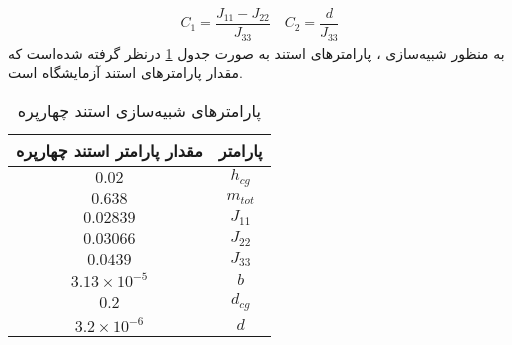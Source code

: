 \begin{align*}
	C_1 =\dfrac{J_{11}-J_{22}}{J_{33}}\quad
	C_2 =\dfrac{d}{J_{33}}
\end{align*}
به منظور شبیه‌سازی ، پارامترهای استند به صورت جدول 
\ref{parameterstable}
درنظر گرفته شده‌است که 
مقدار پارامترهای استند آزمایشگاه است.
\begin{table}[H]
	\caption {پارامترهای شبیه‌سازی استند چهارپره\cite{norian}} 
	\label{parameterstable}
	\begin{center}
		\begin{tabular}{ |c|c| }
			\hline
	مقدار پارامتر استند چهارپره& پارامتر  \\
			\hline
			 $0.02$ & $h_{cg}$ \\
			\hline
			 $0.638$ & $m_{tot}$\\
			\hline
			 $0.02839$ & $J_{11}$\\
			\hline
			 $0.03066$ & $J_{22}$\\
			\hline
			 $0.0439$ & $J_{33}$\\
			\hline
			 $3.13\times10^{-5}$ & $b$\\
			\hline
			 $0.2$ & $d_{cg}$\\
			\hline
			 $3.2\times10^{-6}$ & $d$\\
			\hline
		\end{tabular}
	\end{center}
\end{table}


